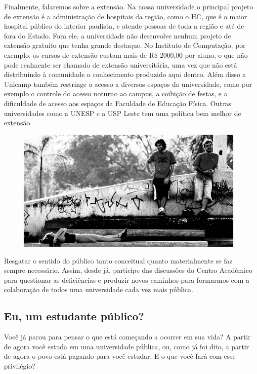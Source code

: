 Finalmente, falaremos sobre a extensão. Na nossa universidade o principal
projeto de extensão é a administração de hospitais da região, como o HC, que é o
maior hospital público do interior paulista, e atende pessoas de toda a região e
até de fora do Estado. Fora ele, a universidade não desenvolve nenhum projeto de
extensão gratuito que tenha grande destaque. No Instituto de Computação, por
exemplo, os cursos de extensão custam mais de R\$ 2000,00 por aluno, o que não
pode realmente ser chamado de extensão universitária, uma vez que não está
distribuindo à comunidade o conhecimento produzido aqui dentro.  Além disso a
Unicamp também restringe o acesso a diversos espaços da universidade, como por
exemplo o controle do acesso noturno ao campus, a coibição de festas, e a
dificuldade de acesso aos espaços da Faculdade de Educação Física. Outras
universidades como a UNESP e a USP Leste tem uma política bem melhor de
extensão.
\begin{figure}[h!]
    \centering
    \includegraphics[scale=0.55,keepaspectratio=true]{img/imgs/4-para_pensar/-024.jpg}
\end{figure}

Resgatar o sentido do público tanto conceitual quanto materialmente se faz
sempre necessário. Assim, desde já, participe das discussões do Centro Acadêmico
para questionar as deficiências e produzir novos caminhos para formarmos com a
colaboração de todos uma universidade cada vez mais pública.

\subsection*{Eu, um estudante público?}

Você já parou para pensar o que está começando a ocorrer em sua vida? A partir
de agora você estuda em uma universidade pública, ou, como já foi dito, a partir
de agora o povo está pagando para você estudar. E o que você fará com esse
privilégio?

